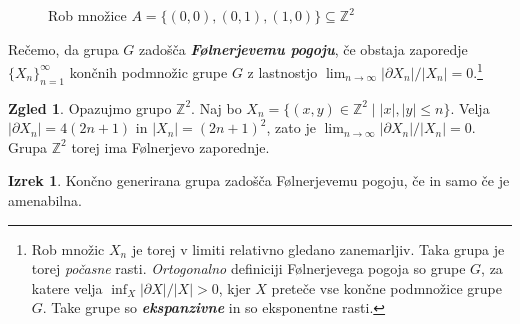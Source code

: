 \documentclass[11pt]{book}
\def\ZZ{\mathbb{Z}}
\def\definicija{\color{rdeca}\bf\em}
\theoremstyle{definition}
\theoremstyle{zgled}
\newtheorem*{zgled}{Zgled}
\theoremstyle{odprtproblem}
\theoremstyle{domacanaloga}
\theoremstyle{izrek}
\newtheorem*{izrek}{Izrek}
\begin{document}
\begin{figure}
\centering
{}
\caption{Rob množice $A = \{ (0,0), (0,1), (1,0) \} \subseteq \ZZ^2$}
\end{figure}

Rečemo, da grupa $G$ zadošča {\definicija Følnerjevemu pogoju}, če obstaja zaporedje $\{ X_n \}_{n = 1}^\infty$ končnih podmnožic grupe $G$ z lastnostjo $\lim_{n \to \infty} |\partial X_n|/|X_n| = 0$.\footnote{Rob množic $X_n$ je torej v limiti relativno gledano zanemarljiv. Taka grupa je torej {\em počasne} rasti. {
\em Ortogonalno} definiciji Følnerjevega pogoja so grupe $G$, za katere velja $\inf_X |\partial X|/|X| > 0$, kjer $X$ preteče vse končne podmnožice grupe $G$. Take grupe so {\definicija ekspanzivne} in so eksponentne rasti.}

\begin{zgled}
Opazujmo grupo $\ZZ^2$. Naj bo $X_n = \{ (x,y) \in \ZZ^2 \mid |x|, |y| \leq n \}$. Velja $|\partial X_n| = 4(2n+1)$ in $|X_n| = (2n+1)^2$, zato je $\lim_{n \to \infty} |\partial X_n|/|X_n| = 0$. Grupa $\ZZ^2$ torej ima Følnerjevo zaporednje.
\end{zgled}

\begin{izrek}
Končno generirana grupa zadošča Følnerjevemu pogoju, če in samo če je amenabilna.
\end{izrek}
\end{document}
